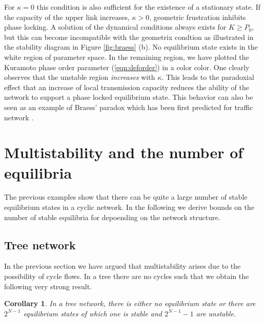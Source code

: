 \documentclass[10pt,aps,pra,onecolumn,superscriptaddress]{revtex4-1}
\newtheorem{corr}{Corollary}
\begin{document}
For $\kappa = 0$ this condition is also sufficient for
the existence of a stationary state. If the capacity of the
upper link increases, $\kappa > 0$, geometric frustration
inhibits phase locking. A solution of the dynamical conditions
always  exists for   $K \ge P_0$, but this can become 
incompatible with the geometrix condtion as illustrated 
in the stability diagram  in Figure \ref{fig:braess} (b). No equilibrium
state exists in the white region of parameter space. 
In the remaining region, we have plotted the Kuramoto phase 
order parameter (\ref{eqn:deforder})
in a color color.
One clearly observes that the unstable region \emph{increases} 
with $\kappa$. This leads to the paradoxial effect that
an increase of local transmission capacity reduces
the ability of the network to support a phase locked 
equilibrium state. This behavior can also be seen as an example of 
Braess' paradox which has been first predicted for traffic 
network \cite{Brae68,12braess}.
 

\section{Multistability and the number of equilibria}

The previous examples show that there can be quite a large
number of stable equilibrium states in a cyclic network. 
In the following we derive bounds on the number of stable 
equilibria for depoending on the network structure.

\subsection{Tree network}

In the previous section we have argued that multistability
arises due to the possibility of cycle flows. In a tree there
are no cycles such that we obtain the following very strong result.

\begin{corr}
\label{eqn:corr-tree}
In a tree network, there is either no equilibrium state
or there are $2^{N-1}$ equilibrium states of which
one is stable and $2^{N-1}-1$ are unstable.
\end{corr}
\end{document}
